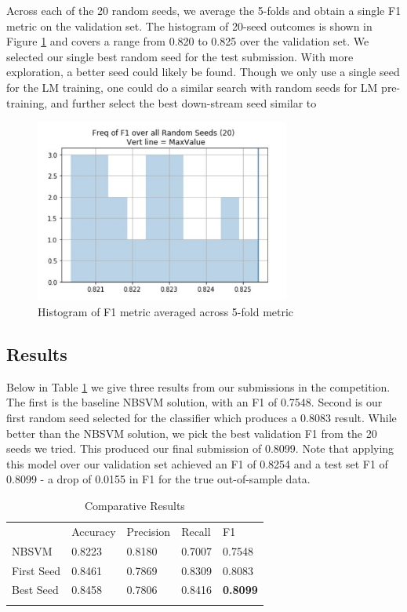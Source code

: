 \documentclass[runningheads]{llncs}
\begin{document}
Across each of the 20 random seeds, we average the 5-folds and obtain a single F1 metric on the validation set. The histogram of 20-seed outcomes is shown in Figure \ref{fig:random_seed_hist} and covers a range  from 0.820 to 0.825 over the validation set. We selected our single best random seed for the test submission. With more exploration, a better seed could likely be found.  Though we only use a single seed for the LM training, one could do a similar search with random seeds for LM pre-training, and further select the best down-stream seed similar to \cite{Poleval:DBLP:journals/corr/abs-1810-10222}

\begin{figure}[ht]
	\includegraphics[width=0.75\textwidth]{seed_hist_f1}
	\caption{Histogram of F1 metric averaged across 5-fold metric}
	\label{fig:random_seed_hist}
\end{figure}

\subsection{Results}
Below in Table \ref{tab:tab_results} we give three results from our submissions in the competition. The first is the baseline NBSVM solution, with an F1 of 0.7548.  Second is our first random seed selected for the classifier which produces a 0.8083 result.  While better than the NBSVM solution, we pick the best validation F1 from the 20 seeds we tried. This produced our final submission of 0.8099.
Note that applying this model over our validation set achieved an F1 of 0.8254 and a test set F1 of 0.8099 - a drop of 0.0155 in F1 for the true out-of-sample data.

\begin{table}[ht]
	\caption{Comparative Results}
	\label{tab:tab_results}
	\begin{tabular}{lllll}
		\hline\noalign{\smallskip}
		 & Accuracy & Precision & Recall & F1 \\
		\noalign{\smallskip}\hline\noalign{\smallskip}
NBSVM &      0.8223 & 0.8180 & 0.7007 & 0.7548 \\
First Seed & 0.8461 & 0.7869 & 0.8309 & 0.8083 \\
Best Seed &  0.8458 & 0.7806 & 0.8416 & \textbf{0.8099} \\
		\noalign{\smallskip}\hline
	\end{tabular}
\end{table}
\end{document}

